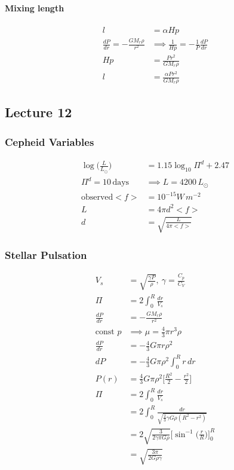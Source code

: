 \documentclass[a4paper,11pt,normalem]{article}
\begin{document}
\paragraph{Mixing length}\label{mixing-length}

\[
    \begin{aligned}
    l &= \alpha Hp \\
    \frac{dP}{dr} = - \frac{GM_r \rho}{r^2} &\implies \frac{1}{Hp} = -\frac{1}{P}\frac{dP}{dr} \\
    Hp &= \frac{Pr^2}{GM_r \rho} \\
    l&= \frac{\alpha Pr^2}{GM_r \rho}
    \end{aligned}
\]

\subsection{Lecture 12}\label{lecture-12}

\subsubsection{Cepheid Variables}\label{cepheid-variables}

\[
    \begin{aligned}
    \log\bigg(\frac{L}{L_{\odot}}\bigg) &= 1.15\log_{10}\Pi^d + 2.47 \\
    \Pi^d = 10\,\text{days} &\implies L = 4200\,L_{\odot} \\
    \text{observed} <f> &= 10^{-15} W\,m^{-2} \\
    L &= 4\pi d^2 <f> \\
    d &= \sqrt{\frac{L}{4\pi<f>}}
    \end{aligned}
\]

\subsubsection{Stellar Pulsation}\label{stellar-pulsation}

\[
    \begin{aligned}
    V_s &= \sqrt{\frac{\gamma P}{\rho}}, ~ \gamma = \frac{C_p}{C_V} \\
    \Pi &= 2\int_0^R \frac{dr}{V_s} \\
    \frac{dP}{dr} &= -\frac{GM_r \rho}{r^2} \\
    \text{const } p &\implies \mu = \frac{4}{3}\pi r^3 \rho \\
    \frac{dP}{dr} &= -\frac{4}{3}G\pi r \rho^2 \\
    dP &= -\frac{4}{3}G\pi\rho^2 \int_0^R r\,dr \\
    P(r) &= \frac{4}{3}G\pi\rho^2 \bigg[\frac{R^2}{2} - \frac{r^2}{2}\bigg] \\
    \Pi &= 2 \int_0^R \frac{dr}{V_s} \\
    &= 2\int_0^R \frac{dr}{\sqrt{\frac{2}{3}\gamma G\rho (R^2 - r^2)}} \\
    &= 2\sqrt{\frac{3}{2\gamma\pi G \rho}} \Bigg[\sin^{-1} \bigg(\frac{r}{R}\bigg)\Bigg]^{R}_{0} \\
    &= \sqrt{\frac{3\pi}{2G\rho\gamma}}
    \end{aligned}
\]
\end{document}
